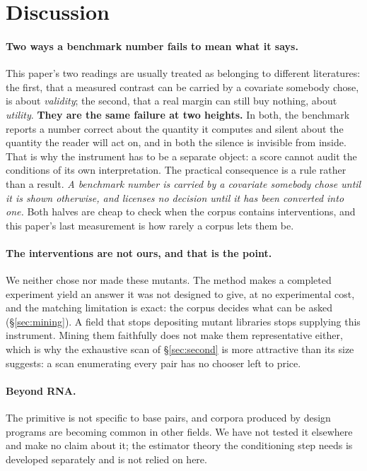 \documentclass[11pt]{article}
\begin{document}
\section{Discussion}
\label{sec:discussion}

\paragraph{Two ways a benchmark number fails to mean what it says.}
This paper's two readings are usually treated as belonging to different literatures: the first,
that a measured contrast can be carried by a covariate somebody chose, is about \emph{validity};
the second, that a real margin can still buy nothing, about \emph{utility}. \textbf{They are the
same failure at two heights.} In both, the benchmark reports a number correct about the quantity
it computes and silent about the quantity the reader will act on, and in both the silence is
invisible from inside. That is why the instrument has to be a separate object: a score cannot
audit the conditions of its own interpretation. The practical consequence is a rule rather than a
result.
\emph{A benchmark number is carried by a covariate somebody chose until it is shown otherwise, and
licenses no decision until it has been converted into one.} Both halves are cheap to check when the
corpus contains interventions, and this paper's last measurement is how rarely a corpus lets them
be.

\paragraph{The interventions are not ours, and that is the point.}
We neither chose nor made these mutants. The method makes a completed experiment yield an answer
it was not designed to give, at no experimental cost, and the matching limitation is exact: the
corpus decides what can be asked (\S\ref{sec:mining}). A field that stops depositing mutant
libraries stops supplying this instrument. Mining them faithfully does not make them
representative either, which is why the exhaustive scan of \S\ref{sec:second} is more attractive
than its size suggests: a scan enumerating every pair has no chooser left to price.

\paragraph{Beyond RNA.} The primitive is not specific to base pairs, and corpora produced by design
programs are becoming common in other fields. We have not tested it elsewhere and make no claim
about it; the estimator theory the conditioning step needs is developed separately and is not relied on here.
\end{document}
